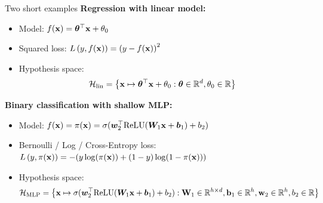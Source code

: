 \documentclass[11pt,compress,t,notes=noshow, xcolor=table]{beamer}
\begin{document}
\begin{vbframe}{Two short examples}
\textbf{Regression with linear model:}\\
\begin{itemize}
    \item Model: $f(\mathbf{x}) = \bm{\theta}^\top \mathbf{x} + \theta_0$
    \item Squared loss:  
    $L\left(y, f(\mathbf{x})\right) = \left(y-f(\mathbf{x})\right)^2$
    \item Hypothesis space: $$\mathcal{H}_{\text{lin}} = \left\{ \mathbf{x} \mapsto \bm{\theta}^\top \mathbf{x} + \theta_0 : \bm{\theta} \in \mathbb{R}^d, \theta_0 \in \mathbb{R} \right\}$$
\end{itemize}

\vspace{0.3cm}

\textbf{Binary classification with shallow MLP:}\\
\begin{itemize}
    \item Model: $f(\mathbf{x}) = \pi(\mathbf{x})= \sigma(\bm{w}_2^{\top} \text{ReLU}(\bm{W}_1 \mathbf{x} + \bm{b}_1) + b_2)$
    \item Bernoulli / Log / Cross-Entropy loss: $L\left(y, \pi(\mathbf{x})\right) = -(y\log(\pi(\mathbf{x}))+(1-y)\log(1-\pi(\mathbf{x})))$\\ 
    \item Hypothesis space: {\small $$\mathcal{H}_{\text{MLP}} = \left\{ \mathbf{x} \mapsto \sigma(\bm{w}_2^{\top} \text{ReLU}(\bm{W}_1 \mathbf{x} + \bm{b}_1) + b_2): \mathbf{W}_1 \in \mathbb{R}^{h \times d}, \mathbf{b}_1 \in \mathbb{R}^h, \mathbf{w}_2 \in \mathbb{R}^h, b_2 \in \mathbb{R} \right\}$$}
\end{itemize}
  
\end{vbframe}
\end{document}
